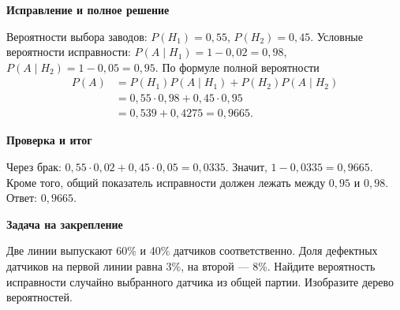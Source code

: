\documentclass[a4paper,12pt]{article}
\newcommand{\topic}[1]{\par\medskip\textcolor{darkaccent}{\textbf{#1}}\par\nopagebreak}
\begin{document}
\topic{Исправление и полное решение}
Вероятности выбора заводов: $P(H_1)=0,55$, $P(H_2)=0,45$. Условные вероятности исправности: $P(A\mid H_1)=1-0,02=0,98$, $P(A\mid H_2)=1-0,05=0,95$. По формуле полной вероятности
\begin{align*}
P(A)&=P(H_1)P(A\mid H_1)+P(H_2)P(A\mid H_2)\\
&=0,55\cdot0,98+0,45\cdot0,95\\
&=0,539+0,4275=0,9665.
\end{align*}
\topic{Проверка и итог}
Через брак: $0,55\cdot0,02+0,45\cdot0,05=0,0335$. Значит, $1-0,0335=0,9665$. Кроме того, общий показатель исправности должен лежать между $0,95$ и $0,98$. Ответ: \textbf{$0,9665$}.
\topic{Задача на закрепление}
Две линии выпускают 60\% и 40\% датчиков соответственно. Доля дефектных датчиков на первой линии равна 3\%, на второй --- 8\%. Найдите вероятность исправности случайно выбранного датчика из общей партии. Изобразите дерево вероятностей.
\end{document}
